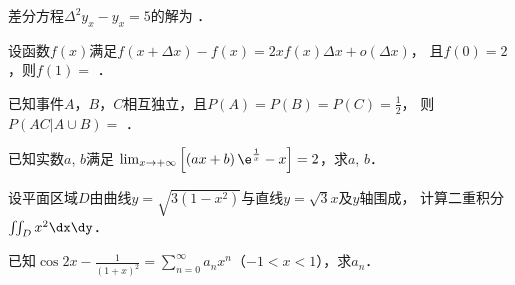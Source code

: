 \documentclass[plain,noanswer,medmath]{../../template/jnuexam}
\begin{document}
\begin{problem}
差分方程$\Delta^2y_x - y_x = 5$的解为 \fillin{}．
\end{problem}


\begin{problem}
设函数$f(x)$满足$f(x + \Delta x) - f(x) = 2xf(x)\Delta x + o(\Delta x)$，
且$f(0) = 2$，则$f(1) =$ \fillin{}．
\end{problem}




\begin{problem}
已知事件$A$，$B$，$C$相互独立，且$P(A) = P(B) = P(C) = \frac{1}{2}$，
则$P\left(\left. AC \right|A \cup B \right) =$ \fillin{}．
\end{problem}




\begin{problem}[points=10]
已知实数$a$, $b$满足
$\lim_{x \to +\infty} \left[\left(ax + b \right) \e^{\frac{1}{x}} - x \right] = 2$，求$a$, $b$．
\end{problem}


\begin{problem}[points=10]
设平面区域$D$由曲线$y = \sqrt{3(1 - x^2)}$与直线$y = \sqrt{3} x$及$y$轴围成，
计算二重积分$\iint_D x^2 \dx\dy$．
\end{problem}




\begin{problem}[points=10]
已知$\cos 2x - \frac{1}{(1 + x)^2} = \sum_{n=0}^{\infty}a_n x^n$（$-1<x<1$），求$a_n$．
\end{problem}










\end{document}
